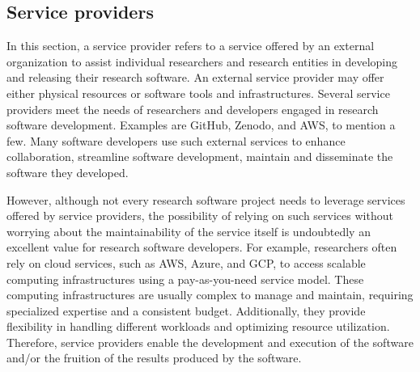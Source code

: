 \subsection{Service providers}


In this section, a service provider refers to a service offered by an external organization to assist individual researchers and research entities in developing and releasing their research software. 
An external service provider may offer either physical resources or software tools and infrastructures.  
Several service providers meet the needs of researchers and developers engaged in research software development. Examples are GitHub, Zenodo, and AWS, to mention a few. Many software developers use such external services to enhance collaboration, streamline software development, maintain and disseminate the software they developed. 

However, although not every research software project needs to leverage services offered by service providers, the possibility of relying on such services without worrying about the maintainability of the service itself is undoubtedly an excellent value for research software developers.  
For example, researchers often rely on cloud services, such as AWS, Azure, and GCP, to access scalable computing infrastructures using a pay-as-you-need service model. These computing infrastructures are usually complex to manage and maintain, requiring specialized expertise and a consistent budget. Additionally, they provide flexibility in handling different workloads and optimizing resource utilization. 
Therefore, service providers enable the development and execution of the software and/or the fruition of the results produced by the software.

